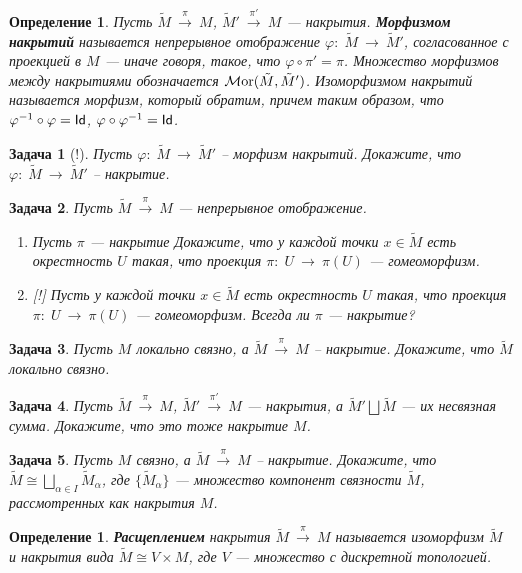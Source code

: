 \documentclass[12pt]{book}
\newcommand{\arrow}{{\:\longrightarrow\:}}
\renewcommand{\phi}{\varphi}
\def\Id{{\operatorname{\sf Id}}}
\newcommand{\Mor}{\operatorname{{\cal M}or}}
\theoremstyle{upshape}
\newtheorem{zadacha}{Задача}[chapter]
\theoremstyle{generic}
\newtheorem{opredelenie}[teorema]{Определение}
\newtheorem{remark}[teorema]{Замечание}
\def\замечание{\begin{remark}}
\def\еза{\end{remark}}
\theoremstyle{upshapenonumber}
\newcommand{\следствие}{%
     \refstepcounter{teorema}
     {\noindent\bf Следствие \thechapter.\arabic{teorema}:\ }}
\newcommand{\пример}{%
     \refstepcounter{teorema}
     {\noindent\bf Пример \thechapter.\arabic{teorema}:\ }}
\newcommand{\лемма}{%
     \refstepcounter{teorema}
     {\noindent\bf Лемма \thechapter.\arabic{teorema}:\ }}
\newcommand{\теорема}{%
     \refstepcounter{teorema}
     {\noindent\bf Теорема \thechapter.\arabic{teorema}:\ }}
\newcommand{\утверждение}{%
     \refstepcounter{teorema}
     {\noindent\bf Утверждение \thechapter.\arabic{teorema}:\ }}
\def\ем{\em}
\def\ит{\it}
\def\задача{\begin{zadacha}}
\def\ез{\end{zadacha}}
\def\еу{\end{ukazanie}}
\def\ео{\end{opredelenie}}
\def\енум{\begin{enumerate}}
\def\ее{\end{enumerate}}
\def\итем{\item %
}
\begin{document}
{\begin{opredelenie}
Пусть $\tilde M \stackrel \pi \arrow M$, 
$\tilde M'\stackrel {\pi'} \arrow M$ --- накрытия.
{\bf Морфизмом накрытий}
называется непрерывное отображение 
$\phi:\; \tilde M\arrow \tilde M'$,
согласованное с проекцией в $M$ --- иначе говоря, такое, что
$\phi\circ \pi' = \pi$.
Множество морфизмов между накрытиями обозначается $\Mor(\tilde M, \tilde M')$.
Изоморфизмом накрытий называется морфизм,
который обратим, причем таким образом,
что $\phi^{-1}\circ \phi=\Id$, $\phi\circ \phi^{-1}=\Id$.
\end{opredelenie}

\begin{zadacha}[!]
Пусть $\phi:\; \tilde M\arrow \tilde M'$ --
морфизм накрытий. Докажите, что 
$\phi:\; \tilde M\arrow \tilde M'$ --
накрытие.
\end{zadacha}

\задача
Пусть $\tilde M \stackrel\pi\arrow M$ --- непрерывное отображение.
\енум
\итем Пусть $\pi$ --- накрытие
Докажите, что у каждой точки $x\in \tilde M$ есть окрестность
$U$ такая, что проекция $\pi:\; U \arrow \pi(U)$ --- гомеоморфизм.
\итем[!] Пусть у каждой точки $x\in \tilde M$ есть окрестность
$U$ такая, что проекция $\pi:\; U \arrow \pi(U)$ --- гомеоморфизм.
Всегда ли $\pi$ --- накрытие?
\ее
\ез

\begin{zadacha} 
Пусть $M$ локально связно, а $\tilde M \stackrel \pi \arrow M$ --
накрытие. Докажите, что $\tilde M$ локально связно.
\end{zadacha}

\begin{zadacha}
Пусть $\tilde M \stackrel \pi \arrow M$,
$\tilde M' \stackrel {\pi'} \arrow M$ --- накрытия,
а $\tilde M'\bigsqcup \tilde M$ --- их несвязная
сумма. Докажите, что это тоже накрытие $M$.
\end{zadacha}

\begin{zadacha}
Пусть $M$ связно, а $\tilde M \stackrel \pi \arrow M$ --
накрытие. Докажите, что 
$\tilde M\cong \bigsqcup_{\alpha\in I} \tilde M_\alpha$,
где $\{\tilde M_\alpha\}$ --- множество компонент связности
$\tilde M$, рассмотренных как накрытия $M$.
\end{zadacha}

\begin{opredelenie}
{\bf Расщеплением} накрытия 
$\tilde M \stackrel \pi \arrow M$
называется изоморфизм $\tilde M$ и накрытия
вида $\tilde M \cong V \times M$, где 
$V$ --- множество с дискретной топологией.
\end{opredelenie}

}
\end{document}
